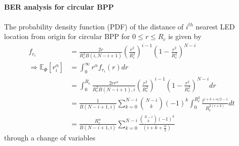 \documentclass[slidestop,usepdftitle=false]{gvvslides}
\providecommand{\sbrak}[1]{\ensuremath{{}\left[#1\right]}}
\providecommand{\brak}[1]{\ensuremath{\left(#1\right)}}
\begin{document}
\begin{frame}
\frametitle{\,}
\framesubtitle{
BER analysis for circular BPP
}   
The probability density function (PDF) of the distance of $i^{th}$ nearest LED location from origin for circular BPP for $0 \leq r \leq R_c$ is given by 
\begin{align}
f_{r_i}	&=
\frac{2r}{R_c^2 B\brak{i,N-i+1}}\brak{\frac{r^2}{R_c^2}}^{i-1}\brak{1-\frac{r^2}{R_c^2}}^{N-i}
\nonumber \\
%
%
 \Rightarrow  \mathbb{E}_{\Phi}\sbrak{r_i^{\alpha}} & =\int_{0}^{\infty}r^{\alpha}f_{r_i}(r)dr \nonumber \\
   & =\int_{0}^{R_c}\frac{2r r^{\alpha}}{R_c^2 B\brak{N-i+1},i} \brak{\frac{r^2}{R_c^2}}^{i-1}
   \brak{1-\frac{r^2}{R_c^2}}^{N-i} dr \nonumber \\
    & =\frac{1}{B\brak{N-i+1,i}}\sum_{k=0}^{N-i}\binom{N-i}{k}(-1)^{k}
    \int_{0}^{R_c^2}\frac{t^{i+k+\alpha/2-1}}{R_c^{2(i+k)}} dt \nonumber \\
     & =\frac{R_c^{\alpha}}{B\brak{N-i+1,i}}\sum_{k=0}^{N-i}\frac{\binom{N-i}{k}\brak{-1}^{k}}{\brak{i+k+\frac{\alpha}{2}}} 
   \end{align}
   through a change of variables 
   \end{frame}
\end{document}
